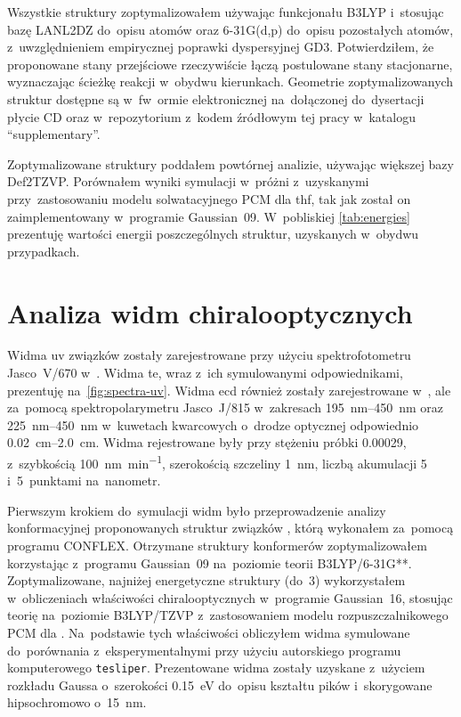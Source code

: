 Wszystkie struktury zoptymalizowałem używając funkcjonału B3LYP i~stosując bazę LANL2DZ
  do~opisu atomów  oraz 6-31G(d,p) do~opisu pozostałych atomów,
  z~uwzględnieniem empirycznej poprawki dyspersyjnej GD3.
Potwierdziłem, że proponowane stany przejściowe rzeczywiście łączą postulowane stany stacjonarne,
  wyznaczając ścieżkę reakcji w~obydwu kierunkach.
Geometrie zoptymalizowanych struktur dostępne są w~fw~ormie elektronicznej na~dołączonej
  do~dysertacji płycie CD oraz w~repozytorium\sidenote{\repourl} z~kodem źródłowym tej pracy
  w~katalogu \enquote{supplementary}.

Zoptymalizowane struktury poddałem powtórnej analizie, używając większej bazy Def2TZVP.
Porównałem wyniki symulacji w~próżni z~uzyskanymi przy~zastosowaniu modelu solwatacyjnego
  PCM dla \gls{thf}, tak jak został on zaimplementowany w~programie Gaussian~09.
W~pobliskiej \cref{tab:energies} prezentuję wartości energii poszczególnych
  struktur, uzyskanych w~obydwu przypadkach.

\section{Analiza widm chiralooptycznych}\label{experimental:spectra}

Widma \gls{uv} związków  zostały zarejestrowane przy użyciu
  spektrofotometru Jasco~V\-/670 w~.
Widma te, wraz z~ich symulowanymi odpowiednikami, prezentuję na~\cref{fig:spectra-uv}.
Widma \gls{ecd} również zostały zarejestrowane w~, ale za~pomocą spektropolarymetru
  Jasco~J\-/815 w~zakresach \SIrange{195}{450}{\nano\meter} oraz \SIrange{225}{450}{\nano\meter}
  w~kuwetach kwarcowych o~drodze optycznej odpowiednio \SIrange{0.02}{2.0}{\centi\meter}.
Widma rejestrowane były przy stężeniu próbki \SI{0.00029}{\molar},
  z~szybkością \SI{100}{\nm\per\minute}, szerokością szczeliny \SI{1}{\nm}, liczbą akumulacji 5
  i~5~punktami na~nanometr.

Pierwszym krokiem do~symulacji widm było przeprowadzenie analizy konformacyjnej
  proponowanych struktur związków , którą wykonałem
  za~pomocą programu CONFLEX.
Otrzymane struktury konformerów zoptymalizowałem korzystając z~programu
  Gaussian~09 na~poziomie teorii B3LYP/6-31G**.
Zoptymalizowane, najniżej energetyczne struktury (do~\SI{3}{\kcalpm}) wykorzystałem w~obliczeniach
  właściwości chiralooptycznych w~programie Gaussian~16, stosując teorię
  na~poziomie B3LYP/TZVP z~zastosowaniem modelu rozpuszczalnikowego PCM dla .
Na~podstawie tych właściwości obliczyłem widma symulowane do~porównania z~eksperymentalnymi
  przy użyciu autorskiego programu komputerowego \texttt{tesliper}.
Prezentowane widma zostały uzyskane z~użyciem rozkładu Gaussa o~szerokości \SI{0.15}{\electronvolt}
  do~opisu kształtu pików i~skorygowane hipsochromowo o~\SI{15}{\nano\meter}.

